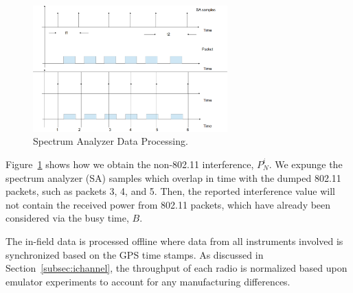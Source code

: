 \begin{figure} 
\centering
\includegraphics[width=75mm]{figures/sa_process}
\vspace{-0.1in}
\caption{Spectrum Analyzer Data Processing.}
\label{fig:sa_process}
\vspace{0.1in}
\end{figure}

Figure~\ref{fig:sa_process} shows how we obtain the
non-802.11 interference, $P_N^i$. We expunge the spectrum analyzer
(SA) samples which overlap in time with the dumped 802.11 packets,
such as packets 3, 4, and 5. Then, the reported interference value
will not contain the received power from 802.11 packets, which have
already been considered via the busy time, $B$.

The in-field data is processed offline where data from all instruments
involved is synchronized based on the GPS time stamps. 
As discussed in Section~\ref{subsec:ichannel}, the throughput of each radio
is normalized based upon emulator experiments to account for any
manufacturing differences.

